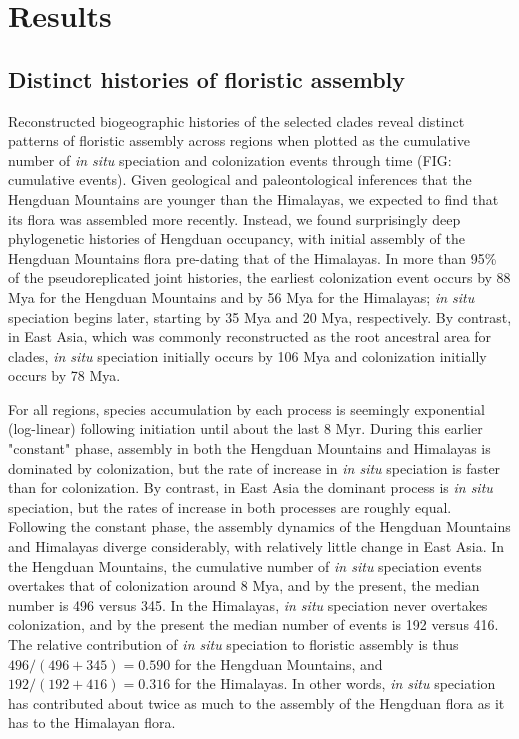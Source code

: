 \section{Results}

\subsection{Distinct histories of floristic assembly}

Reconstructed biogeographic histories of the selected clades reveal distinct patterns of floristic assembly across regions when plotted as the cumulative number of \textit{in situ} speciation and colonization events through time (FIG: cumulative events). Given geological and paleontological inferences that the Hengduan Mountains are younger than the Himalayas, we expected to find that its flora was assembled more recently. Instead, we found surprisingly deep phylogenetic histories of Hengduan occupancy, with initial assembly of the Hengduan Mountains flora pre-dating that of the Himalayas. In more than 95\% of the pseudoreplicated joint histories, the earliest colonization event occurs by 88 Mya for the Hengduan Mountains and by 56 Mya for the Himalayas; \textit{in situ} speciation begins later, starting by 35 Mya and 20 Mya, respectively. By contrast, in East Asia, which was commonly reconstructed as the root ancestral area for clades, \textit{in situ} speciation initially occurs by 106 Mya and colonization initially occurs by 78 Mya.

For all regions, species accumulation by each process is seemingly exponential (log-linear) following initiation until about the last 8 Myr. During this earlier "constant" phase, assembly in both the Hengduan Mountains and Himalayas is dominated by colonization, but the rate of increase in \textit{in situ} speciation is faster than for colonization. By contrast, in East Asia the dominant process is \textit{in situ} speciation, but the rates of increase in both processes are roughly equal. Following the constant phase, the assembly dynamics of the Hengduan Mountains and Himalayas diverge considerably, with relatively little change in East Asia. In the Hengduan Mountains, the cumulative number of \textit{in situ} speciation events overtakes that of colonization around 8 Mya, and by the present, the median number is 496 versus 345. In the Himalayas, \textit{in situ} speciation never overtakes colonization, and by the present the median number of events is 192 versus 416. The relative contribution of \textit{in situ} speciation to floristic assembly is thus $496/(496+345) = 0.590$ for the Hengduan Mountains, and $192/(192+416) = 0.316$ for the Himalayas. In other words, \textit{in situ} speciation has contributed about twice as much to the assembly of the Hengduan flora as it has to the Himalayan flora.

